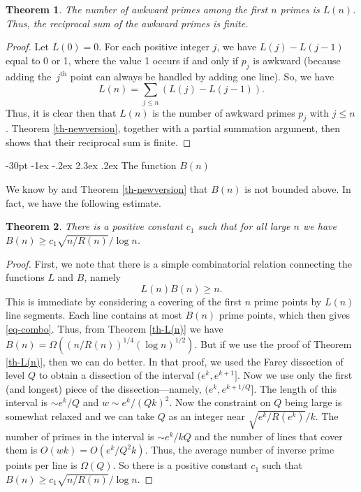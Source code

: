\documentclass[10pt]{article}
\makeatletter
\renewcommand\section{\@startsection {section}{1}{\z@}
{-30pt \@plus -1ex \@minus -.2ex}
{2.3ex \@plus.2ex}
{\normalfont\normalsize\bfseries\boldmath}}
\newtheorem{theorem}{Theorem}
\theoremstyle{definition}
\theoremstyle{remark}
\numberwithin{equation}{section}
\makeatother
\begin{document}
 \begin{theorem}
 \label{th-awkward}
 The number of awkward primes among the first $n$ primes is $L(n)$.
 Thus, the reciprocal sum of the awkward primes is finite.
 \end{theorem}
 \begin{proof}
 Let $L(0)=0$.
 For each positive integer $j$, we have $L(j)-L(j-1)$ equal to 0 or 1, where the value 1 occurs
 if and only if $p_j$ is awkward
 (because adding the~$j^{\text{th}}$ point can always be handled by adding one line). So, we have
 \[
 L(n)=\sum_{j\le n}(L(j)-L(j-1)).
 \] 
 Thus, it is clear then that $L(n)$ is the number of awkward primes $p_j$ with $j\le n$.
 Theorem \ref{th-newversion}, together with a partial summation argument, then
shows that their reciprocal sum is finite.
 \end{proof}

\section{The function $B(n)$}\label{sec-B(n)}

We know by \cite[Theorem~4.1]{P} and Theorem \ref{th-newversion}  that $B(n)$ is not bounded above. 
In fact, we have the following estimate.
\begin{theorem}
 \label{th-B(n)}
 There is a positive constant $c_1$ such that for all large $n$ we have
 $B(n)\ge c_1\sqrt{n/R(n)}/\log n$.
 \end{theorem}
\begin{proof}
First, we note that there is a simple combinatorial relation connecting the functions $L$ and $B$, namely
\begin{equation}
\label{eq-combo}
L(n)B(n)\ge n.
\end{equation}
This is immediate by considering a covering of the first $n$ prime points by $L(n)$ line segments. Each line contains at most $B(n)$ prime points, which then gives \eqref{eq-combo}.  Thus, from Theorem \ref{th-L(n)} we have
$B(n)=\Omega((n/R(n))^{1/4}(\log n)^{1/2})$.  But if we use the proof of Theorem \ref{th-L(n)}, then we can do
better.  In that proof, we used the Farey dissection of level $Q$ to obtain a
dissection of the interval $(e^k,e^{k+1}]$.   Now we use only the first (and longest) piece of the
dissection---namely, $(e^k,e^{k+1/Q}]$.  The length of this interval is $\sim e^k/Q$ and $w\sim e^k/(Qk)^2$.
Now the constraint on $Q$ being large is somewhat relaxed and we can take $Q$ as an integer
near $\sqrt{e^k/R(e^k)}/k$.  The number of primes in the interval is $\sim e^k/kQ$ and the number
of lines that cover them is $O(wk)=O(e^k/Q^2k)$.  Thus, the average number of inverse prime
points per line is $\Omega( Q)$.  So there is a positive constant $c_1$ such that $B(n)\ge c_1\sqrt{n/R(n)}/\log n$.
\end{proof}
\end{document}

